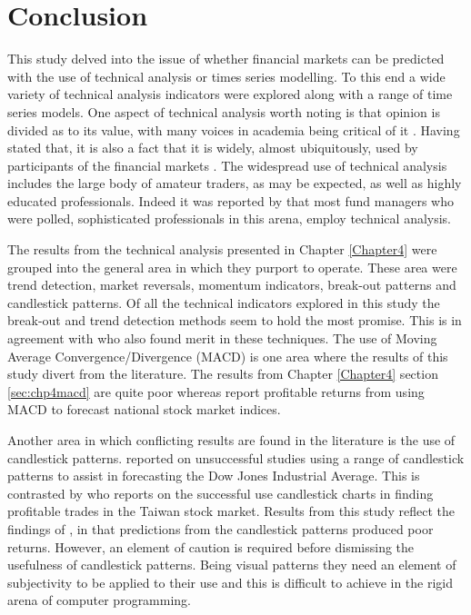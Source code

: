 \section{Conclusion}
This study delved into the issue of whether financial markets can be predicted with the use of technical analysis or times series modelling.  To this end a wide variety of technical analysis indicators were explored along with a range of time series models. One aspect of technical analysis worth noting is that opinion is divided as to its value, with many voices in academia being critical of it \citep{Kuang2014192, Fang201430, Bajgrowicz2012473}. Having stated that, it is also a fact that it is widely, almost ubiquitously, used by participants of the financial markets \citep{Taylor1992304}. The widespread use of technical analysis includes the large body of amateur traders, as may be expected, as well as highly educated professionals. Indeed it was reported by \cite{Menkhoff20102573} that most fund managers who were polled, sophisticated professionals in this arena, employ technical analysis.

The results from the technical analysis presented in Chapter \ref{Chapter4} were grouped into the general area in which they purport to operate. These area were trend detection, market reversals, momentum indicators, break-out patterns and candlestick patterns. Of all the technical indicators explored in this study the break-out and trend detection methods seem to hold the most promise. This is in agreement with \cite{Brock} who also found merit in these techniques. The use of Moving Average Convergence/Divergence (MACD) is one area where the results of this study divert from the literature. The results from Chapter \ref{Chapter4} section \ref{sec:chp4macd} are quite poor whereas \cite{Prodan2013214} report profitable returns from using MACD to forecast national stock market indices.

Another area in which conflicting results are found in the literature is the use of candlestick patterns.  \cite{Marshall20062303} reported on unsuccessful studies using a range of candlestick patterns to assist in forecasting the Dow Jones Industrial Average. This is contrasted by \cite{Lu201465} who reports on the successful use candlestick charts in finding profitable trades in the Taiwan stock market.  Results from this study reflect the findings of \cite{Marshall20062303}, in that predictions from the candlestick patterns produced poor returns. However, an element of caution is required before dismissing the usefulness of candlestick patterns. Being visual patterns they need an element of subjectivity to be applied to their use and this is difficult to achieve in the rigid arena of computer programming. %

